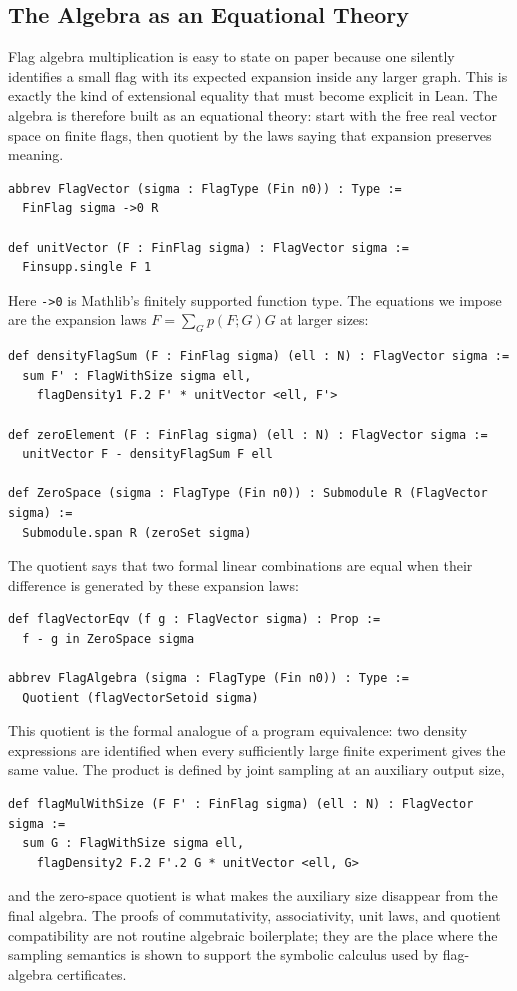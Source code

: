 \documentclass{article}
\newcommand{\lean}[1]{\texttt{#1}}
\begin{document}
\subsection{The Algebra as an Equational Theory}

Flag algebra multiplication is easy to state on paper because one silently
identifies a small flag with its expected expansion inside any larger graph.
This is exactly the kind of extensional equality that must become explicit in
Lean.  The algebra is therefore built as an equational theory: start with the
free real vector space on finite flags, then quotient by the laws saying that
expansion preserves meaning.
\begin{lstlisting}
abbrev FlagVector (sigma : FlagType (Fin n0)) : Type :=
  FinFlag sigma ->0 R

def unitVector (F : FinFlag sigma) : FlagVector sigma :=
  Finsupp.single F 1
\end{lstlisting}
Here \lean{->0} is Mathlib's finitely supported function type.  The equations
we impose are the expansion laws $F = \sum_G p(F;G)G$ at larger sizes:
\begin{lstlisting}
def densityFlagSum (F : FinFlag sigma) (ell : N) : FlagVector sigma :=
  sum F' : FlagWithSize sigma ell,
    flagDensity1 F.2 F' * unitVector <ell, F'>

def zeroElement (F : FinFlag sigma) (ell : N) : FlagVector sigma :=
  unitVector F - densityFlagSum F ell

def ZeroSpace (sigma : FlagType (Fin n0)) : Submodule R (FlagVector sigma) :=
  Submodule.span R (zeroSet sigma)
\end{lstlisting}
The quotient says that two formal linear combinations are equal when their
difference is generated by these expansion laws:
\begin{lstlisting}
def flagVectorEqv (f g : FlagVector sigma) : Prop :=
  f - g in ZeroSpace sigma

abbrev FlagAlgebra (sigma : FlagType (Fin n0)) : Type :=
  Quotient (flagVectorSetoid sigma)
\end{lstlisting}
This quotient is the formal analogue of a program equivalence: two density
expressions are identified when every sufficiently large finite experiment
gives the same value.  The product is defined by joint sampling at an
auxiliary output size,
\begin{lstlisting}
def flagMulWithSize (F F' : FinFlag sigma) (ell : N) : FlagVector sigma :=
  sum G : FlagWithSize sigma ell,
    flagDensity2 F.2 F'.2 G * unitVector <ell, G>
\end{lstlisting}
and the zero-space quotient is what makes the auxiliary size disappear from
the final algebra.  The proofs of commutativity, associativity, unit laws, and
quotient compatibility are not routine algebraic boilerplate; they are the
place where the sampling semantics is shown to support the symbolic calculus
used by flag-algebra certificates.
\end{document}
